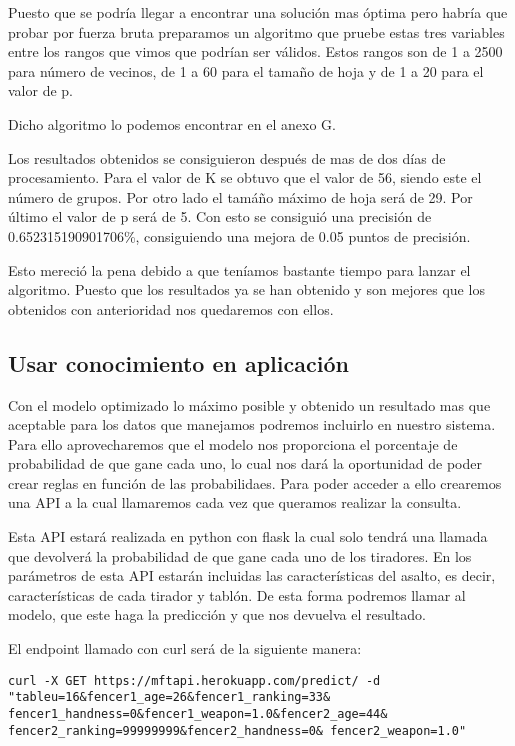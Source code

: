 Puesto que se podría llegar a encontrar una solución mas óptima pero habría que probar
por fuerza bruta preparamos un algoritmo que pruebe estas tres variables entre los rangos
que vimos que podrían ser válidos. Estos rangos son de 1 a 2500 para número de vecinos,
de 1 a 60 para el tamaño de hoja y de 1 a 20 para el valor de p.

Dicho algoritmo lo podemos encontrar en el anexo G.

Los resultados obtenidos se consiguieron después de mas de dos días de procesamiento.
Para el valor de K se obtuvo que el valor de 56, siendo este el número de grupos. Por otro lado
el tamáño máximo de hoja será de 29. Por último el valor de p será de 5. Con esto se consiguió
una precisión de 0.652315190901706\%, consiguiendo una mejora de 0.05 puntos de precisión.

Esto mereció la pena debido a que teníamos bastante tiempo para lanzar el algoritmo. Puesto que
los resultados ya se han obtenido y son mejores que los obtenidos con anterioridad nos
quedaremos con ellos.

\subsection{Usar conocimiento en aplicación}

Con el modelo optimizado lo máximo posible y obtenido un resultado mas que aceptable
para los datos que manejamos podremos incluirlo en nuestro sistema. Para ello aprovecharemos
que el modelo nos proporciona el porcentaje de probabilidad de que gane cada uno, lo cual nos
dará la oportunidad de poder crear reglas en función de las probabilidaes. Para poder acceder
a ello crearemos una API a la cual llamaremos cada vez que queramos realizar la consulta.

Esta API estará realizada en python con flask la cual solo tendrá una llamada que devolverá
la probabilidad de que gane cada uno de los tiradores. En los parámetros de esta API estarán
incluidas las características del asalto, es decir, características de cada tirador y tablón.
De esta forma podremos llamar al modelo, que este haga la predicción y que nos
devuelva el resultado.

El endpoint llamado con curl será de la siguiente manera:

\begin{lstlisting}
curl -X GET https://mftapi.herokuapp.com/predict/ -d "tableu=16&fencer1_age=26&fencer1_ranking=33& fencer1_handness=0&fencer1_weapon=1.0&fencer2_age=44& fencer2_ranking=99999999&fencer2_handness=0& fencer2_weapon=1.0"
\end{lstlisting}

